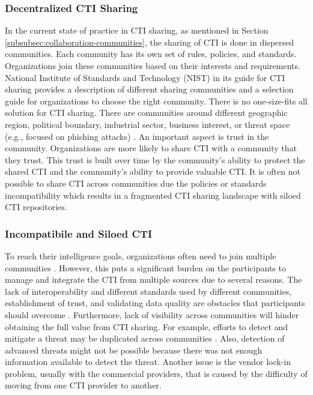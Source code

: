 \subsubsection{Decentralized CTI Sharing}
In the current state of practice in CTI sharing, as mentioned in Section \ref{subsubsec:collaboration-communities}, the sharing of CTI is done in dispersed communities. Each community has its own set of rules, policies, and standards.
Organizations join these communities based on their interests and requirements.  National Institute of Standards and Technology (NIST) in its guide for CTI sharing \cite{johnson_guide_2016} provides a description of different sharing communities and a selection guide for organizations to choose the right community. There is no one-size-fits all solution for CTI sharing. There are communities around different geographic region, political boundary, industrial sector, business interest, or threat space (e.g., focused on phishing attacks) \cite{johnson_guide_2016}.
An important aspect is trust in the community. Organizations are more likely to share CTI with a community that they trust. This trust is built over time by the community's ability to protect the shared CTI and the community's ability to provide valuable CTI. It is often not possible to share CTI across communities due the policies or standards incompatibility which results in a fragmented CTI sharing landscape with siloed CTI repositories. 

\subsubsection{Incompatibile and Siloed CTI}
To reach their intelligence goals, organizations often need to join multiple communities \cite{johnson_guide_2016}. However, this puts a significant burden on the participants to manage and integrate the CTI from multiple sources due to several reasons. The lack of interoperability and different standards used by different communities, establishment of trust, and validating data quality are obstacles that participants should overcome \cite{zibak_cyber_2019}. 
Furthermore, lack of visibility across communities will hinder obtaining the full value from CTI sharing. For example, efforts to detect and mitigate a threat may be duplicated across communities \cite{zibak_cyber_2019}. Also, detection of advanced threats might not be possible because there was not enough information available to detect the threat. Another issue is the vendor lock-in problem, usually with the commercial providers, that is caused by the difficulty of moving from one CTI provider to another.

